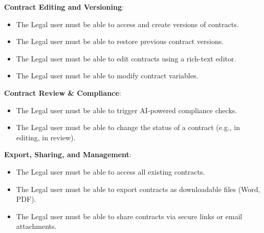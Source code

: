 \textbf{Contract Editing and Versioning}:\vspace{0.4em}
\begin{adjustwidth}{3em}{1em}
    \begin{itemize}
        \item The Legal user must be able to access and create versions of contracts.\vspace{0.4em}
        \item The Legal user must be able to restore previous contract versions.\vspace{0.4em}
        \item The Legal user must be able to edit contracts using a rich-text editor.\vspace{0.4em}
        \item The Legal user must be able to modify contract variables.
    \end{itemize}
\end{adjustwidth}\vspace{0.85em} 

\textbf{Contract Review \& Compliance}:\vspace{0.4em}
\begin{adjustwidth}{3em}{1em}
    \begin{itemize}
        \item The Legal user must be able to trigger AI-powered compliance checks.\vspace{0.4em}
        \item The Legal user must be able to change the status of a contract (e.g., in editing, in review).
    \end{itemize}
\end{adjustwidth}\vspace{0.85em} 

\textbf{Export, Sharing, and Management}:\vspace{0.4em}
\begin{adjustwidth}{3em}{1em}
    \begin{itemize}
        \item The Legal user must be able to access all existing contracts.\vspace{0.4em}
        \item The Legal user must be able to export contracts as downloadable files (Word, PDF).\vspace{0.4em}
        \item The Legal user must be able to share contracts via secure links or email attachments.
    \end{itemize}
\end{adjustwidth}\vspace{0.85em} 

